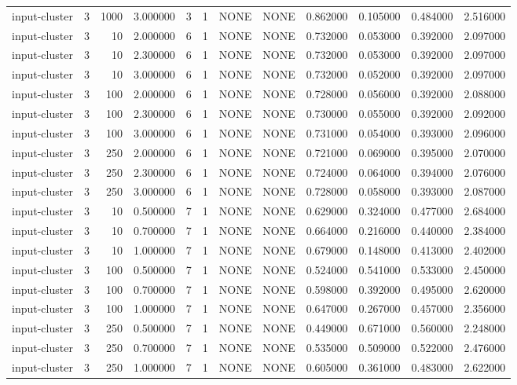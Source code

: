 \begin{tabular}{lrrrllllrrrr}
input-cluster & 3 & 1000 & 3.000000 & 3 & 1 & NONE & NONE & 0.862000 & 0.105000 & 0.484000 & 2.516000 \\
input-cluster & 3 & 10 & 2.000000 & 6 & 1 & NONE & NONE & 0.732000 & 0.053000 & 0.392000 & 2.097000 \\
input-cluster & 3 & 10 & 2.300000 & 6 & 1 & NONE & NONE & 0.732000 & 0.053000 & 0.392000 & 2.097000 \\
input-cluster & 3 & 10 & 3.000000 & 6 & 1 & NONE & NONE & 0.732000 & 0.052000 & 0.392000 & 2.097000 \\
input-cluster & 3 & 100 & 2.000000 & 6 & 1 & NONE & NONE & 0.728000 & 0.056000 & 0.392000 & 2.088000 \\
input-cluster & 3 & 100 & 2.300000 & 6 & 1 & NONE & NONE & 0.730000 & 0.055000 & 0.392000 & 2.092000 \\
input-cluster & 3 & 100 & 3.000000 & 6 & 1 & NONE & NONE & 0.731000 & 0.054000 & 0.393000 & 2.096000 \\
input-cluster & 3 & 250 & 2.000000 & 6 & 1 & NONE & NONE & 0.721000 & 0.069000 & 0.395000 & 2.070000 \\
input-cluster & 3 & 250 & 2.300000 & 6 & 1 & NONE & NONE & 0.724000 & 0.064000 & 0.394000 & 2.076000 \\
input-cluster & 3 & 250 & 3.000000 & 6 & 1 & NONE & NONE & 0.728000 & 0.058000 & 0.393000 & 2.087000 \\
input-cluster & 3 & 10 & 0.500000 & 7 & 1 & NONE & NONE & 0.629000 & 0.324000 & 0.477000 & 2.684000 \\
input-cluster & 3 & 10 & 0.700000 & 7 & 1 & NONE & NONE & 0.664000 & 0.216000 & 0.440000 & 2.384000 \\
input-cluster & 3 & 10 & 1.000000 & 7 & 1 & NONE & NONE & 0.679000 & 0.148000 & 0.413000 & 2.402000 \\
input-cluster & 3 & 100 & 0.500000 & 7 & 1 & NONE & NONE & 0.524000 & 0.541000 & 0.533000 & 2.450000 \\
input-cluster & 3 & 100 & 0.700000 & 7 & 1 & NONE & NONE & 0.598000 & 0.392000 & 0.495000 & 2.620000 \\
input-cluster & 3 & 100 & 1.000000 & 7 & 1 & NONE & NONE & 0.647000 & 0.267000 & 0.457000 & 2.356000 \\
input-cluster & 3 & 250 & 0.500000 & 7 & 1 & NONE & NONE & 0.449000 & 0.671000 & 0.560000 & 2.248000 \\
input-cluster & 3 & 250 & 0.700000 & 7 & 1 & NONE & NONE & 0.535000 & 0.509000 & 0.522000 & 2.476000 \\
input-cluster & 3 & 250 & 1.000000 & 7 & 1 & NONE & NONE & 0.605000 & 0.361000 & 0.483000 & 2.622000 \\

\end{tabular}
